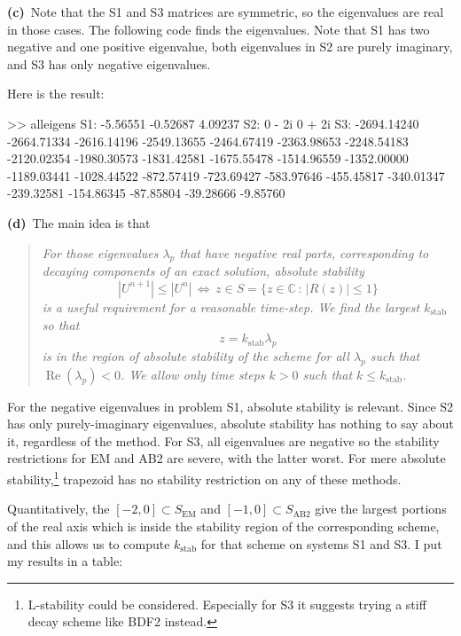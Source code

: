 \documentclass[11pt]{amsart}
\newcommand{\CC}{\mathbb{C}}
\newcommand{\prob}[1]{\bigskip\noindent\textbf{#1}\, }
\newcommand{\mfile}[2]{
	\medskip
	\begin{quote}
		\bigskip
		\VerbatimInput[frame=single,framesep=3mm,label=\fbox{\normalsize \textsl{\,#1\,}},fontfamily=courier,fontsize=\scriptsize]{#2}
		\bigskip
	\end{quote}
}
\newcommand{\kstab}{k_{\text{stab}}}
\begin{document}
\medskip
\prob{(c)}  Note that the S1 and S3 matrices are symmetric, so the eigenvalues are real in those cases.  The following code finds the eigenvalues.  Note that S1 has two negative and one positive eigenvalue, both eigenvalues in S2 are purely imaginary, and S3 has only negative eigenvalues.

\mfile{alleigens.m}{alleigens.m}

Here is the result:
\begin{mVerb}
>> alleigens
S1:
  -5.56551  -0.52687  4.09237
S2:
  0 - 2i    0 + 2i
S3:
  -2694.14240  -2664.71334  -2616.14196  -2549.13655  -2464.67419  -2363.98653
  -2248.54183  -2120.02354  -1980.30573  -1831.42581  -1675.55478  -1514.96559
  -1352.00000  -1189.03441  -1028.44522   -872.57419   -723.69427   -583.97646
   -455.45817   -340.01347   -239.32581   -154.86345    -87.85804    -39.28666
     -9.85760
\end{mVerb}

\prob{(d)}  The main idea is that

\begin{quote}
\emph{For those eigenvalues $\lambda_p$ that have negative real parts, corresponding to decaying components of an exact solution, absolute stability}
    $$|U^{n+1}|\le |U^n| \,\iff\, z\in S = \{z\in\CC\,:\,|R(z)|\le 1\}$$
\emph{is a useful requirement for a reasonable time-step.  We find the largest $\kstab$ so that}
    $$z = \kstab \lambda_p$$
\emph{is in the region of absolute stability of the scheme for all $\lambda_p$ such that $\operatorname{Re}(\lambda_p)<0$.  We allow only time steps $k>0$ such that $k\le \kstab$.}
\end{quote}

For the negative eigenvalues in problem S1, absolute stability is relevant.  Since S2 has only purely-imaginary eigenvalues, absolute stability has nothing to say about it, regardless of the method.  For S3, all eigenvalues are negative so the stability restrictions for EM and AB2 are severe, with the latter worst.  For mere absolute stability,\footnote{L-stability could be considered.  Especially for S3 it suggests trying a stiff decay scheme like BDF2 instead.} trapezoid has no stability restriction on any of these methods.

Quantitatively, the $[-2,0]\subset S_{\text{EM}}$ and $[-1,0]\subset S_{\text{AB2}}$ give the largest portions of the real axis which is inside the stability region of the corresponding scheme, and this allows us to compute $\kstab$ for that scheme on systems S1 and S3.  I put my results in a table:
\end{document}

